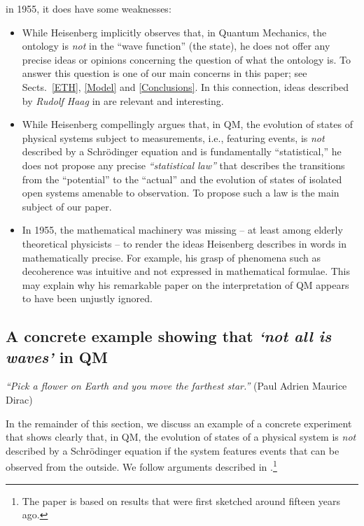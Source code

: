 \documentclass[a4paper,11pt]{article}
\begin{document}
in 1955, it does have some weaknesses: 
\begin{itemize}
\item{While Heisenberg implicitly observes that, in Quantum Mechanics, the ontology is \textit{not} in 
the ``wave function'' (the state), he does not offer any precise ideas or opinions concerning the question of 
what the ontology is. To answer this question is one of our main concerns in this paper; see Sects.~\ref{ETH}, \ref{Model} 
and \ref{Conclusions}. In this connection, ideas described by \textit{Rudolf Haag} in \cite{Rudolf} are relevant and 
interesting.}
\item{While Heisenberg compellingly argues that, in QM, the evolution of states of physical systems subject to 
measurements, i.e., featuring events, is \textit{not} described by a Schr\"odinger equation and is fundamentally 
``statistical,'' he does not propose any precise \textit{``statistical law''} that describes the transitions from the 
``potential'' to the ``actual'' and the evolution of states of isolated open systems amenable to observation. 
To propose such a law is the main subject of our paper.}
\item{In 1955, the mathematical machinery was missing -- at least among elderly theoretical physicists -- 
to render the ideas Heisenberg describes in words in \cite{Heisenberg} mathematically precise. 
For example, his grasp of phenomena such as decoherence was intuitive and not expressed in 
mathematical formulae. This may explain why his remarkable paper on the interpretation of QM 
appears to have been unjustly ignored.}
\end{itemize}

\subsection{A concrete example showing that \textit{`not all is waves'} in QM}
\hspace{0.5cm} \textit{``Pick a flower on Earth and you move the farthest star.''} (Paul Adrien Maurice Dirac)

In the remainder of this section, we discuss an example of a concrete experiment that shows clearly that, in QM, the evolution 
of states of a physical system is \textit{not} described by a Schr\"odinger equation if the system features events that can be
observed from the outside. We follow arguments described in 
\cite{FFS, Schill}.\footnote{The paper \cite{FFS} is based on results that were first sketched around fifteen years ago.} \\
\end{document}
